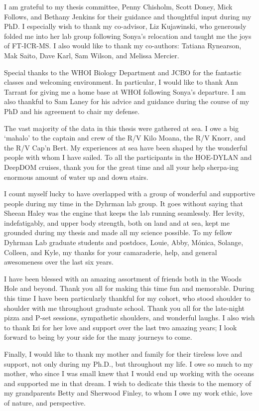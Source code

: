 {I am grateful to my thesis committee, Penny Chisholm, Scott Doney, Mick Follows, and Bethany Jenkins for their guidance and thoughtful input during my PhD. I especially wish to thank my co-advisor, Liz Kujawinski, who generously folded me into her lab group following Sonya's relocation and taught me the joys of FT-ICR-MS. I also would like to thank my co-authors: Tatiana Rynearson, Mak Saito, Dave Karl, Sam Wilson, and Melissa Mercier. \par 

Special thanks to the WHOI Biology Department and JCBO for the fantastic classes and welcoming environment. In particular, I would like to thank Ann Tarrant for giving me a home base at WHOI following Sonya's departure. I am also thankful to Sam Laney for his advice and guidance during the course of my PhD and his agreement to chair my defense. \par 

The vast majority of the data in this thesis were gathered at sea. I owe a big `mahalo' to the captain and crew of the R/V Kilo Moana, the R/V Knorr, and the R/V Cap'n Bert. My experiences at sea have been shaped by the wonderful people with whom I have sailed. To all the participants in the HOE-DYLAN and DeepDOM cruises, thank you for the great time and all your help sherpa-ing enormous amount of water up and down stairs.\par

I count myself lucky to have overlapped with a group of wonderful and supportive people during my time in the Dyhrman lab group. It goes without saying that Sheean Haley was the engine that keeps the lab running seamlessly. Her levity, indefatigably, and upper body strength, both on land and at sea, kept me grounded during my thesis and made all my science possible. To my fellow Dyhrman Lab graduate students and postdocs, Louie, Abby, M\'{o}nica, Solange, Colleen, and Kyle, my thanks for your camaraderie, help, and general awesomeness over the last six years. \par

I have been blessed with an amazing assortment of friends both in the Woods Hole and beyond. Thank you all for making this time fun and memorable. During this time I have been particularly thankful for my cohort, who stood shoulder to shoulder with me throughout graduate school. Thank you all for the late-night pizza and P-set sessions, sympathetic shoulders, and wonderful laughs. I also wish to thank Izi for her love and support over the last two amazing years; I look forward to being by your side for the many journeys to come. \par
 
Finally, I would like to thank my mother and family for their tireless love and support, not only during my Ph.D., but throughout my life. I owe so much to my mother, who since I was small knew that I would end up working with the oceans and supported me in that dream. I wish to dedicate this thesis to the memory of my grandparents Betty and Sherwood Finley, to whom I owe my work ethic, love of nature, and perspective.\par 


}
 


